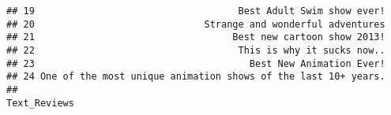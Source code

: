 \documentclass[
]{article}
\begin{document}
\begin{verbatim}
## 19                                    Best Adult Swim show ever!
## 20                              Strange and wonderful adventures
## 21                                   Best new cartoon show 2013!
## 22                                    This is why it sucks now..
## 23                                      Best New Animation Ever!
## 24 One of the most unique animation shows of the last 10+ years.
##                                                                                                                                                                                                                                                                                                                                                                                                                                                                                                                                                                                                                                                                                                                                                                                                                                                                                                                                                                                                                                                                                                                                                                                                                                                                                                                                                                                                                                                                                                                                                                                                                                                                                                                                                                                                                                                                                                                                                                                                                                                                                                                                                                                                                                                                                                                                                                                                                                           Text_Reviews

\end{verbatim}
\end{document}
